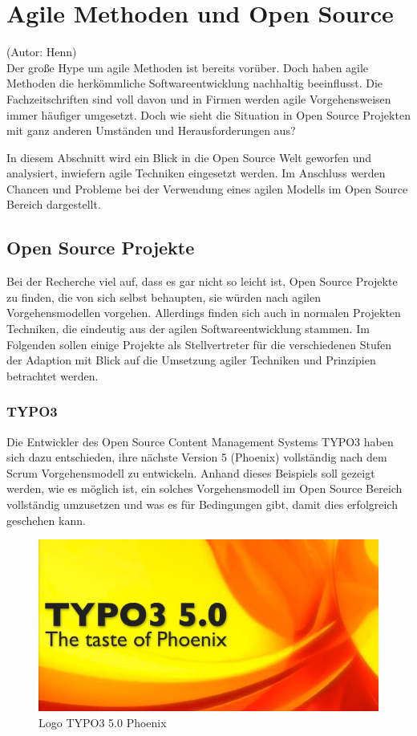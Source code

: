 \section{Agile Methoden und Open Source}
(Autor: Henn)\\

Der große Hype um agile Methoden ist bereits vorüber. Doch haben agile Methoden die herkömmliche Softwareentwicklung nachhaltig beeinflusst. Die Fachzeitschriften sind voll davon und in Firmen werden agile Vorgehensweisen immer häufiger umgesetzt. Doch wie sieht die Situation in Open Source Projekten mit ganz anderen Umständen und Herausforderungen aus?

In diesem Abschnitt wird ein Blick in die Open Source Welt geworfen und
analysiert, inwiefern agile Techniken eingesetzt werden. Im Anschluss werden
Chancen und Probleme bei der Verwendung eines agilen Modells im Open Source
Bereich dargestellt.


\subsection{Open Source Projekte}
Bei der Recherche viel auf, dass es gar nicht so leicht ist, Open Source
Projekte zu finden, die von sich selbst behaupten, sie würden nach agilen
Vorgehensmodellen vorgehen. Allerdings finden sich auch in normalen Projekten
Techniken, die eindeutig aus der agilen Softwareentwicklung stammen. Im Folgenden
sollen einige Projekte als Stellvertreter für die verschiedenen Stufen der
Adaption mit Blick auf die Umsetzung agiler Techniken und Prinzipien betrachtet werden.

\subsubsection{TYPO3}
Die Entwickler des Open Source Content Management Systems TYPO3 haben sich dazu
entschieden, ihre nächste Version 5 (Phoenix) vollständig nach dem Scrum Vorgehensmodell zu
entwickeln. Anhand dieses Beispiels soll gezeigt werden, wie es möglich ist,
ein solches Vorgehensmodell im Open Source Bereich vollständig umzusetzen und
was es für Bedingungen gibt, damit dies erfolgreich geschehen kann.
\begin{figure}[h]
	\centering
	\includegraphics[width=1\textwidth]{images/typo3_Phoenix_logo.jpg}
	\caption{Logo TYPO3 5.0 Phoenix}
	\label{Logo-Phoenix}
\end{figure}

